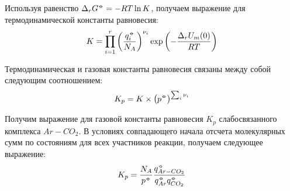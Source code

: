 Используя равенство $\Delta_r G^{\barcirc} = - RT \ln K$, получаем выражение для термодинамической константы равновесия:
\vverh
\begin{gather}
	K = \prod_{i = 1}^{r} \lb \frac{q_i^{\barcirc}}{N_A} \rb^{\nu_i} \exp \lb - \frac{\Delta_r U_m (0)}{RT} \rb \notag
\end{gather}

Термодинамическая и газовая константы равновесия связаны между собой следующим соотношением: 
\vverh
\begin{gather}
	K_p =  K \times \lb p^{\barcirc} \rb^{\sum_i \nu_i} \notag 
\end{gather}

Получим выражение для газовой константы равновесия $K_p$ слабосвязанного комплекса $Ar-CO_2$. В условиях совпадающего начала отсчета молекулярных сумм по состояниям для всех участников реакции, получаем следующее выражение:
\vverh
\begin{gather}
	K_p = \frac{N_A}{p^{\barcirc}} \frac{q_{Ar-CO_2}^{\barcirc}}{q_{Ar}^{\barcirc} q_{CO_2}^{\barcirc}} \notag
\end{gather}
